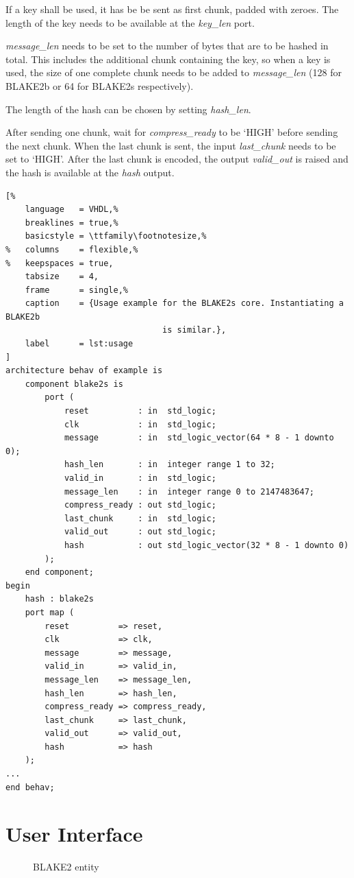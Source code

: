 \documentclass[%
	a4paper,
]
{article}
\begin{document}
If a key shall be used, it has be be sent as first chunk, padded with zeroes.
The length of the key needs to be available at the \emph{key_len} port.

\emph{message_len} needs to be set to the number of bytes that are to be
hashed in total. This includes the additional chunk containing the key, so when
a key is used, the size of one complete chunk needs to be added to
\emph{message_len} (128 for BLAKE2b or 64 for BLAKE2s respectively).

The length of the hash can be chosen by setting
\emph{hash_len}.

After sending one chunk, wait for \emph{compress_ready} to be `HIGH' before
sending the next chunk. When the last chunk is sent, the input
\emph{last_chunk} needs to be set to `HIGH'. After the last chunk is
encoded, the output \emph{valid_out} is raised and the hash is available at the
\emph{hash} output.

\begin{lstlisting}[%
	language   = VHDL,%
	breaklines = true,%
	basicstyle = \ttfamily\footnotesize,%
%	columns    = flexible,%
%	keepspaces = true,
	tabsize    = 4,
	frame      = single,%
	caption    = {Usage example for the BLAKE2s core. Instantiating a BLAKE2b
								is similar.},
	label      = lst:usage
]
architecture behav of example is
	component blake2s is
		port (
			reset          : in  std_logic;
			clk            : in  std_logic;
			message        : in  std_logic_vector(64 * 8 - 1 downto 0);
			hash_len       : in  integer range 1 to 32;
			valid_in       : in  std_logic;
			message_len    : in  integer range 0 to 2147483647;
			compress_ready : out std_logic;
			last_chunk     : in  std_logic;
			valid_out      : out std_logic;
			hash           : out std_logic_vector(32 * 8 - 1 downto 0)
		);
	end component;
begin
	hash : blake2s
	port map (
		reset          => reset,
		clk            => clk,
		message        => message,
		valid_in       => valid_in,
		message_len    => message_len,
		hash_len       => hash_len,
		compress_ready => compress_ready,
		last_chunk     => last_chunk,
		valid_out      => valid_out,
		hash           => hash
	);
...
end behav;
\end{lstlisting}
%
%
\section{User Interface}
\label{sec:user-interface}
%

\begin{figure}[h!]
	\centering
	\small
	
	\caption{BLAKE2 entity}
	\label{fig:blake-entity}
\end{figure}
\end{document}
